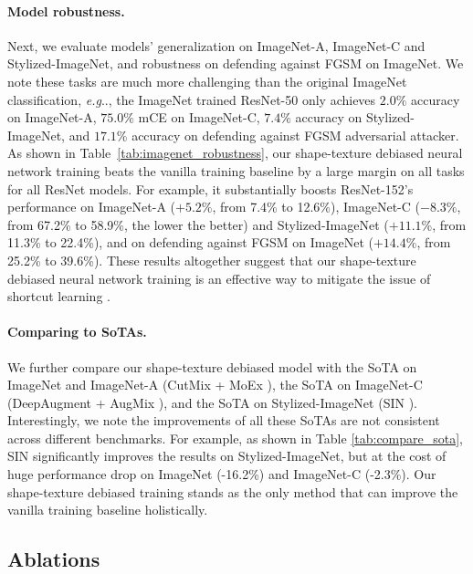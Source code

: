 \documentclass{article} \usepackage{iclr2021_conference,times}
\makeatletter
\DeclareRobustCommand\onedot{\futurelet\@let@token\@onedot}
\def\@onedot{\ifx\@let@token.\else.\null\fi\xspace}
\def\eg{\emph{e.g}\onedot} \def\Eg{\emph{E.g}\onedot}
\makeatother
\begin{document}
\paragraph{Model robustness.}
Next, we evaluate models' generalization on ImageNet-A, ImageNet-C and Stylized-ImageNet, and robustness on defending against FGSM on ImageNet. 
We note these tasks are much more challenging than the original ImageNet classification, \eg, the ImageNet trained ResNet-50 only achieves $2.0\%$ accuracy  on ImageNet-A,  $75.0\%$ mCE on ImageNet-C,  $7.4\%$ accuracy on Stylized-ImageNet, and $17.1\%$ accuracy on defending against FGSM adversarial attacker.
As shown in Table~\ref{tab:imagenet_robustness}, our shape-texture debiased neural network training beats the vanilla training baseline by a large margin on all tasks for all ResNet models. 
For example, it substantially boosts ResNet-152's performance on ImageNet-A ($+5.2\%$, from 7.4\% to 12.6\%), ImageNet-C ($-8.3\%$, from 67.2\% to 58.9\%, the lower the better) and Stylized-ImageNet ($+11.1\%$, from 11.3\% to 22.4\%), and on defending against FGSM on ImageNet ($+14.4\%$, from 25.2\% to 39.6\%). These results altogether suggest that our shape-texture debiased neural network training is an effective way to mitigate the issue of shortcut learning \citep{geirhos2020shortcut}. 


\paragraph{Comparing to SoTAs.}
We further compare our shape-texture debiased model with the SoTA on ImageNet and ImageNet-A (CutMix + MoEx \citep{li2020feature}), the SoTA on ImageNet-C (DeepAugment + AugMix \citep{hendrycks2020many}), and the SoTA on Stylized-ImageNet (SIN \citep{geirhos2018imagenettrained}). 
Interestingly, we note the improvements of all these SoTAs are not consistent across different benchmarks. For example, as shown in Table \ref{tab:compare_sota}, SIN significantly improves the results on Stylized-ImageNet, but at the cost of huge performance drop on ImageNet (-16.2\%) and ImageNet-C (-2.3\%). Our shape-texture debiased training stands as the only method that can improve the vanilla training baseline holistically.


\subsection{Ablations}
\end{document}
